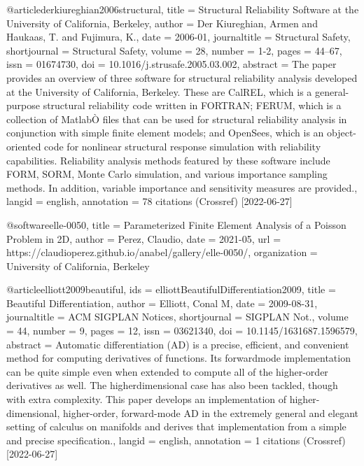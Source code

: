 @article{derkiureghian2006structural,
  title = {Structural Reliability Software at the {{University}} of {{California}}, {{Berkeley}}},
  author = {Der Kiureghian, Armen and Haukaas, T. and Fujimura, K.},
  date = {2006-01},
  journaltitle = {Structural Safety},
  shortjournal = {Structural Safety},
  volume = {28},
  number = {1-2},
  pages = {44--67},
  issn = {01674730},
  doi = {10.1016/j.strusafe.2005.03.002},
  abstract = {The paper provides an overview of three software for structural reliability analysis developed at the University of California, Berkeley. These are CalREL, which is a general-purpose structural reliability code written in FORTRAN; FERUM, which is a collection of MatlabÒ files that can be used for structural reliability analysis in conjunction with simple finite element models; and OpenSees, which is an object-oriented code for nonlinear structural response simulation with reliability capabilities. Reliability analysis methods featured by these software include FORM, SORM, Monte Carlo simulation, and various importance sampling methods. In addition, variable importance and sensitivity measures are provided.},
  langid = {english},
  annotation = {78 citations (Crossref) [2022-06-27]}
}

@software{elle-0050,
  title = {Parameterized Finite Element Analysis of a {{Poisson}} Problem in {{2D}}},
  author = {Perez, Claudio},
  date = {2021-05},
  url = {https://claudioperez.github.io/anabel/gallery/elle-0050/},
  organization = {University of California, Berkeley}
}

@article{elliott2009beautiful,
  ids = {elliottBeautifulDifferentiation2009},
  title = {Beautiful {{Differentiation}}},
  author = {Elliott, Conal M},
  date = {2009-08-31},
  journaltitle = {ACM SIGPLAN Notices},
  shortjournal = {SIGPLAN Not.},
  volume = {44},
  number = {9},
  pages = {12},
  issn = {03621340},
  doi = {10.1145/1631687.1596579},
  abstract = {Automatic differentiation (AD) is a precise, efficient, and convenient method for computing derivatives of functions. Its forwardmode implementation can be quite simple even when extended to compute all of the higher-order derivatives as well. The higherdimensional case has also been tackled, though with extra complexity. This paper develops an implementation of higher-dimensional, higher-order, forward-mode AD in the extremely general and elegant setting of calculus on manifolds and derives that implementation from a simple and precise specification.},
  langid = {english},
  annotation = {1 citations (Crossref) [2022-06-27]}
}

